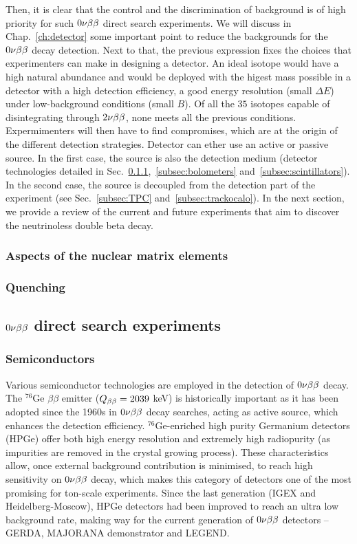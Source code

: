 Then, it is clear that the control and the discrimination of background is of high priority for such $0\nu\beta\beta$ direct search experiments.
We will discuss in Chap.~\ref{ch:detector} some important point to reduce the backgrounds for the $0\nu\beta\beta$ decay detection.
Next to that, the previous expression fixes the choices that experimenters can make in designing a detector.
An ideal isotope would have a high natural abundance and would be deployed with the higest mass possible in a detector with a high detection efficiency, a good energy resolution (small $\Delta E$) under low-background conditions (small $B$).
Of all the $35$ isotopes capable of disintegrating through $2\nu\beta\beta$, none meets all the previous conditions.
Expermimenters will then have to find compromises, which are at the origin of the different detection strategies.
Detector can ether use an active or passive source.
In the first case, the source is also the detection medium (detector technologies detailed in Sec.~\ref{subsec:semiconductors},~\ref{subsec:bolometers} and~\ref{subsec:scintillators}).
In the second case, the source is decoupled from the detection part of the experiment (see Sec.~\ref{subsec:TPC} and~\ref{subsec:trackocalo}).
In the next section, we provide a review of the current and future experiments that aim to discover the neutrinoless double beta decay.

\subsubsection{Aspects of the nuclear matrix elements}
\label{subsec:matrix_element}
\subsubsection{Quenching}
\label{subsec:quenching}

\subsection{$0\nu\beta\beta$ direct search experiments}
\label{sec:zeronuexp}
\subsubsection{Semiconductors}
\label{subsec:semiconductors}
Various semiconductor technologies are employed in the detection of $0\nu\beta\beta$ decay.
The $^{76}$Ge $\beta\beta$ emitter ($Q_{\beta\beta}=2039$ keV) is historically important as it has been adopted since the 1960s in $0\nu\beta\beta$ decay searches, acting as active source, which enhances the detection efficiency.
$^{76}$Ge-enriched high purity Germanium detectors (HPGe) offer both high energy resolution and extremely high radiopurity (as impurities are removed in the crystal growing process).
These characteristics allow, once external background contribution is minimised, to reach high sensitivity on $0\nu\beta\beta$ decay, which makes this category of detectors one of the most promising for ton-scale experiments.
Since the last generation (IGEX and Heidelberg-Moscow), HPGe detectors had been improved to reach an ultra low background rate, making way for the current generation of $0\nu\beta\beta$ detectors -- GERDA, MAJORANA demonstrator and LEGEND.\\

